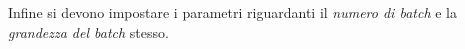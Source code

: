 \noindent  Infine si devono impostare i parametri riguardanti il \textit{numero di batch}
e la \textit{grandezza del batch} stesso.

